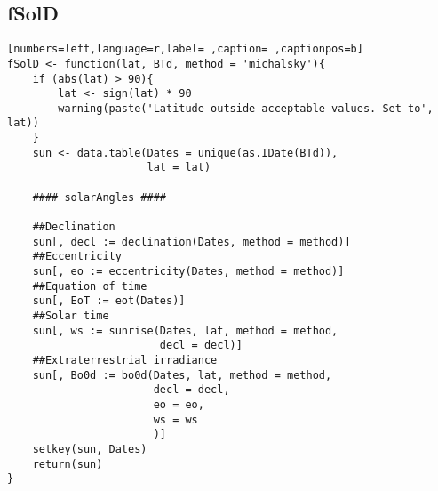 \subsection{fSolD}
\label{sec:org46afd58}
\begin{lstlisting}[numbers=left,language=r,label= ,caption= ,captionpos=b]
fSolD <- function(lat, BTd, method = 'michalsky'){
    if (abs(lat) > 90){
        lat <- sign(lat) * 90
        warning(paste('Latitude outside acceptable values. Set to', lat))
    }
    sun <- data.table(Dates = unique(as.IDate(BTd)),
                      lat = lat)

    #### solarAngles ####

    ##Declination
    sun[, decl := declination(Dates, method = method)]
    ##Eccentricity
    sun[, eo := eccentricity(Dates, method = method)]
    ##Equation of time
    sun[, EoT := eot(Dates)]
    ##Solar time
    sun[, ws := sunrise(Dates, lat, method = method,
                        decl = decl)]
    ##Extraterrestrial irradiance
    sun[, Bo0d := bo0d(Dates, lat, method = method,
                       decl = decl,
                       eo = eo,
                       ws = ws
                       )]
    setkey(sun, Dates)
    return(sun)
}
\end{lstlisting}
